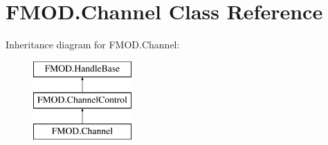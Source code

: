 \hypertarget{class_f_m_o_d_1_1_channel}{}\section{F\+M\+O\+D.\+Channel Class Reference}
\label{class_f_m_o_d_1_1_channel}
Inheritance diagram for F\+M\+O\+D.\+Channel\+:\begin{figure}[H]
\begin{center}
\leavevmode
\includegraphics[height=3.000000cm]{class_f_m_o_d_1_1_channel}
\end{center}
\end{figure}
